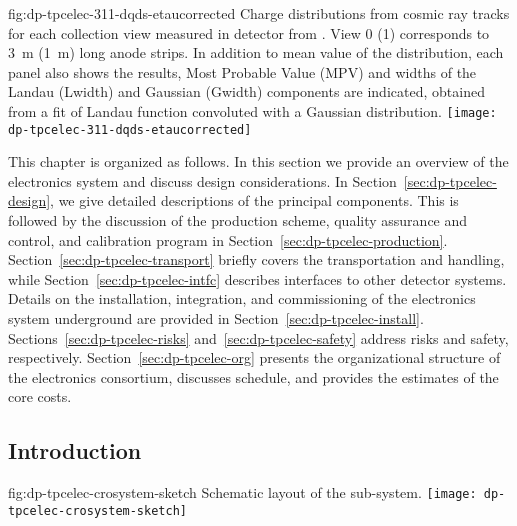 \begin{dunefigure}{fig:dp-tpcelec-311-dqds-etaucorrected}
{Charge distributions from cosmic ray tracks for each collection view measured in  detector from \cite{Aimard:2018yxp}. View \num{0} (\num{1}) corresponds to \SI{3}{\meter} (\SI{1}{\meter}) long anode strips. In addition to mean value of the distribution, each panel also shows the results, Most Probable Value (MPV) and widths of the Landau (Lwidth) and Gaussian (Gwidth) components are indicated, obtained from a fit of Landau function convoluted with a Gaussian distribution.}
\texttt{[image: dp-tpcelec-311-dqds-etaucorrected]}
\end{dunefigure}

This chapter is organized as follows. In this section we provide an overview of the   electronics system and discuss design considerations. In Section~\ref{sec:dp-tpcelec-design}, we give detailed descriptions of the principal components. This is followed by the discussion of the production scheme, quality assurance and control, and calibration program in Section~\ref{sec:dp-tpcelec-production}. Section~\ref{sec:dp-tpcelec-transport} briefly covers the transportation and handling, while Section~\ref{sec:dp-tpcelec-intfc} describes interfaces to other detector systems. Details on the installation, integration, and commissioning of the   electronics system underground are provided in Section~\ref{sec:dp-tpcelec-install}. Sections~\ref{sec:dp-tpcelec-risks} and~\ref{sec:dp-tpcelec-safety} address risks and safety, respectively. Section~\ref{sec:dp-tpcelec-org} presents the organizational structure of the   electronics consortium, discusses schedule, and provides the estimates of the core costs. 


\subsection{Introduction}
\label{ssec:dp-tpcelec-intro}

\begin{dunefigure}{fig:dp-tpcelec-crosystem-sketch}
{Schematic layout of the   sub-system.}
\texttt{[image: dp-tpcelec-crosystem-sketch]}
\end{dunefigure}

